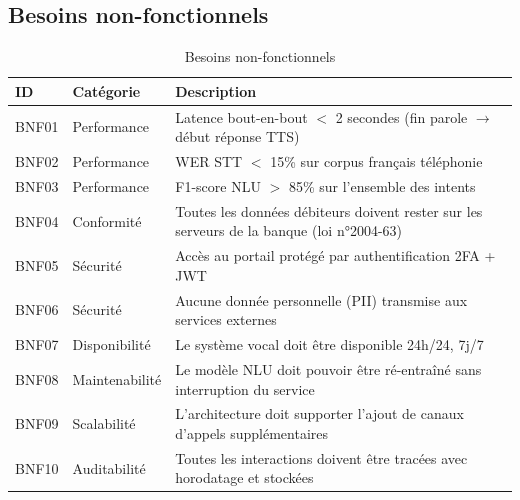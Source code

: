 
\subsection{Besoins non-fonctionnels}


\begin{table}[H]
  \centering
  \caption{Besoins non-fonctionnels}
  \label{tab:besoins_non_fonctionnels}
  \begin{tabularx}{\textwidth}{llX}
    \toprule
    \textbf{ID} & \textbf{Catégorie} & \textbf{Description} \\
    \midrule
    BNF01 & Performance   & Latence bout-en-bout $<$ 2 secondes (fin parole $\rightarrow$ début réponse TTS) \\
    BNF02 & Performance   & \ac{WER} \ac{STT} $<$ 15\% sur corpus français téléphonie \\
    BNF03 & Performance   & F1-score \ac{NLU} $>$ 85\% sur l'ensemble des intents \\
    BNF04 & Conformité    & Toutes les données débiteurs doivent rester sur les serveurs de la banque (loi n°2004-63) \\
    BNF05 & Sécurité      & Accès au portail protégé par authentification 2FA + \ac{JWT} \\
    BNF06 & Sécurité      & Aucune donnée personnelle (\ac{PII}) transmise aux services externes \\
    BNF07 & Disponibilité & Le système vocal doit être disponible 24h/24, 7j/7 \\
    BNF08 & Maintenabilité & Le modèle NLU doit pouvoir être ré-entraîné sans interruption du service \\
    BNF09 & Scalabilité   & L'architecture doit supporter l'ajout de canaux d'appels supplémentaires \\
    BNF10 & Auditabilité  & Toutes les interactions doivent être tracées avec horodatage et stockées \\
    \bottomrule
  \end{tabularx}
\end{table}

